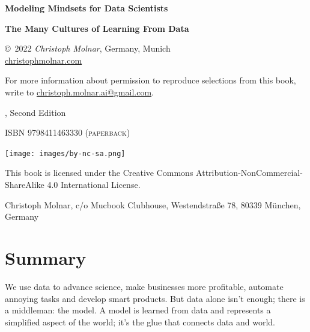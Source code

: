 \documentclass[
  10pt,
]{scrbook}
\begin{document}
\thispagestyle{empty}
\begin{center}
  {
  \bfseries \sffamily \LARGE Modeling Mindsets for Data Scientists \par
  \bfseries \small The Many Cultures of Learning From Data  \par
}

\copyright~2022 \textit{Christoph Molnar}, Germany, Munich\\
\url{christophmolnar.com}

For more information about permission to reproduce selections from this book, write to \url{christoph.molnar.ai@gmail.com}.

	\the\year, Second Edition

\ifxetex
	\textsc{ISBN 9798411463330 (paperback)} 
\fi

\texttt{[image: images/by-nc-sa.png]}

This book is licensed under the Creative Commons Attribution-NonCommercial-ShareAlike 4.0 International License.
  
  Christoph Molnar,
  c/o Mucbook Clubhouse,
  Westendstraße 78,
  80339 München, Germany

\end{center}

\newpage
\thispagestyle{empty}
\mbox{}
\newpage








{
\hypersetup{linkcolor=}
\setcounter{tocdepth}{1}
\tableofcontents
}
\hypertarget{summary}{%
\chapter*{Summary}\label{summary}}


We use data to advance science, make businesses more profitable, automate annoying tasks and develop smart products.
But data alone isn't enough; there is a middleman: the model.
A model is learned from data and represents a simplified aspect of the world; it's the glue that connects data and world.
\end{document}
